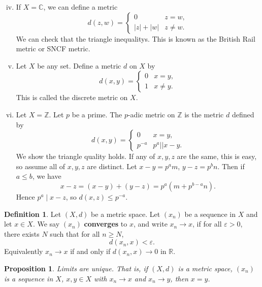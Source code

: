 \documentclass[12pt]{article}
\newtheorem{proposition}{Proposition}[section]
\theoremstyle{definition}
\newtheorem{definition}{Definition}[section]
\theoremstyle{remark}
\begin{document}
\begin{adjustbox}{minipage = \columnwidth - 25.5pt, margin=1em, frame=1pt, margin=0em}
\begin{enumerate}[(i)]
	\setcounter{enumi}{3}
		\item If $X = \mathbb{C}$, we can define a metric
			\[
				d(z, w) =
				\begin{cases}
					0 & z = w,\\
					|z| + |w| & z \neq w.
				\end{cases}
			\]
			We can check that the triangle inequalitys. This is known as the British Rail metric or SNCF metric.
		\item Let $X$ be any set. Define a metric $d$ on $X$ by
			\[
				d(x, y) =
				\begin{cases}
					0 & x = y,\\
					1 & x \neq y.
				\end{cases}
			\]
			This is called the discrete metric on $X$.
		\item Let $X = \mathbb{Z}$. Let $p$ be a prime. The $p$-adic metric on $\mathbb{Z}$ is the metric $d$ defined by
			\[
				d(x, y) =
				\begin{cases}
					0 & x = y, \\
					p^{-a} & p^{a} |\!| x - y.
				\end{cases}
			\]
			We show the triangle quality holds. If any of $x, y, z$ are the same, this is easy, so assume all of $x, y, z$ are distinct. Let $x - y= p^{a}m$, $y - z = p^{b}n$. Then if $a \leq b$, we have
			\[
				x - z = (x - y) + (y - z) = p^{a}(m + p^{b-a}n)
			.\]
			Hence $p^{a} \mid x - z$, so $d(x, z) \leq p^{-a}$.
\end{enumerate}

\end{adjustbox}

\begin{definition}
	Let $(X, d)$ be a metric space. Let $(x_n)$ be a sequence in $X$ and let $x \in X$. We say $(x_n)$ \textbf{converges} to $x$, and write $x_n \to x$, if for all $\varepsilon > 0$, there exists $N$ such that for all $n \geq N$,
	\[
		d(x_n, x) < \varepsilon
	.\]
	Equivalently $x_n \to x$ if and only if $d(x_n, x) \to 0$ in $\mathbb{R}$.
\end{definition}

\begin{proposition}
	Limits are unique. That is, if $(X, d)$ is a metric space, $(x_n)$ is a sequence in $X$, $x, y \in X$ with $x_n \to x$ and $x_n \to y$, then $x = y$.
\end{proposition}
\end{document}
